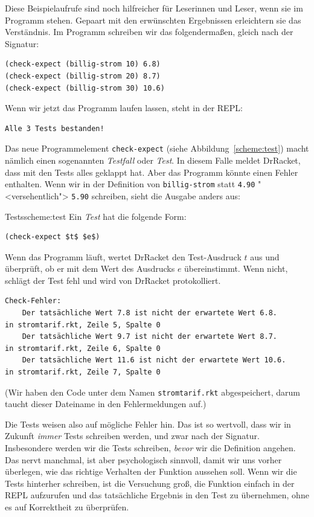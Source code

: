 Diese Beispielaufrufe sind noch hilfreicher für Leserinnen und Leser,
wenn sie im Programm stehen.  Gepaart mit den erwünschten Ergebnissen
erleichtern sie das Verständnis.  Im Programm schreiben wir
das folgendermaßen, gleich nach der Signatur:
%
\begin{lstlisting}
(check-expect (billig-strom 10) 6.8)
(check-expect (billig-strom 20) 8.7)
(check-expect (billig-strom 30) 10.6)
\end{lstlisting}
%
Wenn wir jetzt das Programm laufen lassen, steht in der REPL:
%
\begin{verbatim}
Alle 3 Tests bestanden!
\end{verbatim}
%
Das neue Programmelement
\lstinline{check-expect} (siehe
Abbildung~\ref{scheme:test}) macht
nämlich einen sogenannten \textit{Testfall} oder \textit{Test}.  In diesem Falle
meldet DrRacket, dass mit den Tests alles geklappt hat.  Aber das
Programm könnte einen Fehler enthalten.  Wenn wir in der Definition
von \lstinline{billig-strom} statt \lstinline{4.90} "<versehentlich">
\lstinline{5.90} schreiben, sieht die Ausgabe anders aus:
%
\begin{feature}{Tests}{scheme:test}
  Ein \textit{Test} hat die folgende Form:
\begin{lstlisting}
(check-expect $t$ $e$)
\end{lstlisting}
%
Wenn das Programm läuft, wertet DrRacket den Test-Ausdruck $t$ aus und
überprüft, ob er mit dem Wert des Ausdrucks $e$ übereinstimmt.  Wenn
nicht, schlägt der Test fehl und wird von DrRacket protokolliert.
\end{feature}
%
\begin{verbatim}
Check-Fehler:
	Der tatsächliche Wert 7.8 ist nicht der erwartete Wert 6.8.
in stromtarif.rkt, Zeile 5, Spalte 0 
	Der tatsächliche Wert 9.7 ist nicht der erwartete Wert 8.7.
in stromtarif.rkt, Zeile 6, Spalte 0 
	Der tatsächliche Wert 11.6 ist nicht der erwartete Wert 10.6.
in stromtarif.rkt, Zeile 7, Spalte 0 
\end{verbatim}
%
(Wir haben den Code unter dem Namen \texttt{stromtarif.rkt}
abgespeichert, darum taucht dieser Dateiname in den Fehlermeldungen auf.)

Die Tests weisen also auf mögliche Fehler hin.  Das ist so
wertvoll, dass wir in Zukunft \emph{immer} Tests schreiben werden, und
zwar nach der Signatur.  Insbesondere werden wir die Tests schreiben,
\emph{bevor} wir die Definition angehen.  Das nervt manchmal, ist aber
psychologisch sinnvoll, damit wir uns vorher überlegen, wie das
richtige Verhalten der Funktion aussehen soll.  Wenn wir die Tests
hinterher schreiben, ist die Versuchung groß, die Funktion einfach in
der REPL aufzurufen und das tatsächliche Ergebnis in den Test zu
übernehmen, ohne es auf Korrektheit zu überprüfen.

